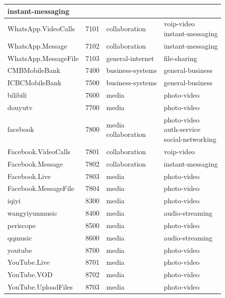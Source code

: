 \begin{longtable}{p{}|p{}|p{}|p{}}
{                                                      instant-messaging} \\ \hline
    WhatsApp.VideoCalls &	7101 &	collaboration &	\tabincell{l}{voip-video\\
                                                                  instant-messaging} \\ \hline
    WhatsApp.Message &	7102 &	collaboration &	instant-messaging \\ \hline
    WhatsApp.MessageFile &	7103 &	general-internet &	file-sharing \\ \hline
    CMBMobileBank &	7400 &	business-systems &	general-business \\ \hline
    ICBCMobileBank &	7500 &	business-systems &	general-business \\ \hline
    bilibili &	7600 &	media &	photo-video \\ \hline
    douyutv &	7700 &	media &	photo-video \\ \hline
    facebook &	7800 &	\tabincell{l}{media\\ 
                                      collaboration}	& \tabincell{l}{photo-video\\
                                                                        auth-service\\
                                                                        social-networking} \\ \hline
    Facebook.VideoCalls &	7801 &	collaboration &	voip-video \\ \hline
    Facebook.Message &	7802 &	collaboration &	instant-messaging \\ \hline
    Facebook.Live &	7803 &	media &	photo-video \\ \hline
    Facebook.MessageFile &	7804 &	media &	photo-video \\ \hline
    iqiyi &	8300 &	media &	photo-video \\ \hline
    wangyiyunmusic &	8400 &	media &	audio-streaming \\ \hline
    periscope &	8500 &	media &	photo-video \\ \hline
    qqmusic &	8600 &	media &	audio-streaming \\ \hline
    youtube &	8700 &	media &	photo-video \\ \hline
    YouTube.Live &	8701 &	media &	photo-video \\ \hline
    YouTube.VOD &	8702 &	media &	photo-video \\ \hline
    YouTube.UploadFiles &	8703 &	media &	photo-video \\ \hline

\end{longtable}
